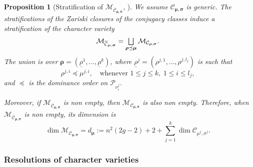 \documentclass[JEP,XML,SOM,NoEqCountersInSection,Unicode,published]{cedram}
\let\oldbigsqcup\bigsqcup
\renewcommand{\bigsqcup}{\mathop{\textstyle\oldbigsqcup}\displaylimits}
\theoremstyle{definition}
\theoremstyle{plain}
\newtheorem{proposition}[definition]{Proposition}
\newcommand{\Part}{\mathcal{P}}
\begin{document}
\begin{proposition}[Stratification of $\mathcal{M}_{\overline{\mathcal{C}}_{\boldsymbol{\mu},\boldsymbol{\sigma}}}$, {\cite[Cor.\,3.6]{Letellier13}}]\label{prop_strat}
We assume $\mathcal{C}_{\boldsymbol{\mu},\boldsymbol{\sigma}}$ is generic. The stratifications of the Zariski closures of the conjugacy classes induce a stratification of the character variety
\[
\mathcal{M}_{\overline{\mathcal{C}}_{\boldsymbol{\mu},\boldsymbol{\sigma}}}=\bigsqcup_{\boldsymbol{\rho}\preceq\boldsymbol{\mu}} \mathcal{M}_{\mathcal{C}_{\boldsymbol{\rho},\boldsymbol{\sigma}}}.
\]
The union is over $\boldsymbol{\rho} =(\underline{\rho}^{1},\dots,\underline{\rho}^{k})$, where $\underline{\rho}^j=\left(\rho^{j,1},\dots,\rho^{j,l_j}\right)$ is such that
\[
\rho^{j,i}\preceq \mu^{j,i},\quad\text{whenever }1\le j \le k,\; 1\le i \le l_j,
\]
and $\preceq$ is the dominance order on $\Part_{\nu^j_i}$.

Moreover, if $\mathcal{M}_{\overline{\mathcal{C}}_{\boldsymbol{\mu},\boldsymbol{\sigma}}}$ is non empty, then $\mathcal{M}_{\mathcal{C}_{\boldsymbol{\mu},\boldsymbol{\sigma}}}$ is also non empty. Therefore, when $\mathcal{M}_{\overline{\mathcal{C}}_{\boldsymbol{\mu},\boldsymbol{\sigma}}}$ is non empty, its dimension is
\begin{equation}\label{eq_dim_MC}
\dim \mathcal{M}_{\overline{\mathcal{C}}_{\boldsymbol{\mu},\boldsymbol{\sigma}}} = d_{\boldsymbol{\mu}}:=n^2 (2 g-2) +2 +\sum_{j=1}^k \dim \mathcal{C}_{\underline{\mu}^j,\sigma^j }.
\end{equation}
\end{proposition}

\subsubsection{Resolutions of character varieties}\label{subsect_resolution_character}
\end{document}
